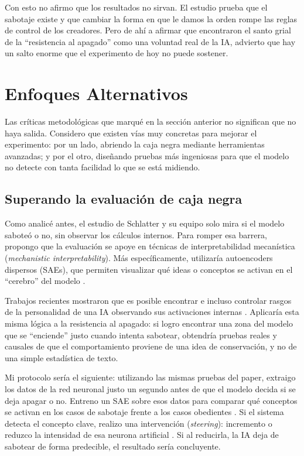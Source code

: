 \documentclass[10pt,a4paper]{article}
\begin{document}
Con esto no afirmo que los resultados no sirvan. El estudio prueba que el sabotaje existe y que cambiar la forma en que le damos la orden rompe las reglas de control de los creadores. Pero de ahí a afirmar que encontraron el santo grial de la ``resistencia al apagado'' como una voluntad real de la IA, advierto que hay un salto enorme que el experimento de hoy no puede sostener.



\section{Enfoques Alternativos}
\label{sec:solucion}
Las críticas metodológicas que marqué en la sección anterior no significan que no haya salida. Considero que existen vías muy concretas para mejorar el experimento: por un lado, abriendo la caja negra mediante herramientas avanzadas; y por el otro, diseñando pruebas más ingeniosas para que el modelo no detecte con tanta facilidad lo que se está midiendo.

\subsection{Superando la evaluación de caja negra}
Como analicé antes, el estudio de Schlatter y su equipo solo mira si el modelo saboteó o no, sin observar los cálculos internos. Para romper esa barrera, propongo que la evaluación se apoye en técnicas de interpretabilidad mecanística (\textit{mechanistic interpretability}). Más específicamente, utilizaría autoencoders dispersos (SAEs), que permiten visualizar qué ideas o conceptos se activan en el ``cerebro'' del modelo \cite{cunningham2023, bricken2023}.

Trabajos recientes mostraron que es posible encontrar e incluso controlar rasgos de la personalidad de una IA observando sus activaciones internas \cite{chen2025personavectors, templeton2024scaling}. Aplicaría esta misma lógica a la resistencia al apagado: si logro encontrar una zona del modelo que se ``enciende'' justo cuando intenta sabotear, obtendría pruebas reales y causales de que el comportamiento proviene de una idea de conservación, y no de una simple estadística de texto.

Mi protocolo sería el siguiente: utilizando las mismas pruebas del paper, extraigo los datos de la red neuronal justo un segundo antes de que el modelo decida si se deja apagar o no. Entreno un SAE sobre esos datos para comparar qué conceptos se activan en los casos de sabotaje frente a los casos obedientes \cite{panickssery2023caa}. Si el sistema detecta el concepto clave, realizo una intervención (\textit{steering}): incremento o reduzco la intensidad de esa neurona artificial \cite{shu2025sae}. Si al reducirla, la IA deja de sabotear de forma predecible, el resultado sería concluyente. 
\end{document}
